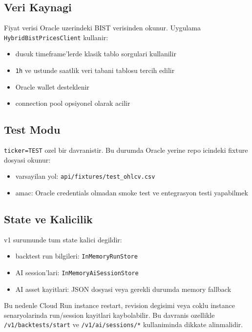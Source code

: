 \documentclass[11pt,a4paper]{article}
\begin{document}
\subsection{Veri Kaynagi}

Fiyat verisi Oracle uzerindeki BIST verisinden okunur. Uygulama \texttt{HybridBistPricesClient} kullanir:

\begin{itemize}[leftmargin=1.5em]
    \item dusuk timeframe'lerde klasik tablo sorgulari kullanilir
    \item \texttt{1h} ve ustunde saatlik veri tabani tablosu tercih edilir
    \item Oracle wallet desteklenir
    \item connection pool opsiyonel olarak acilir
\end{itemize}

\subsection{Test Modu}

\texttt{ticker=TEST} ozel bir davranistir. Bu durumda Oracle yerine repo icindeki fixture dosyasi okunur:

\begin{itemize}[leftmargin=1.5em]
    \item varsayilan yol: \texttt{api/fixtures/test\_ohlcv.csv}
    \item amac: Oracle credentials olmadan smoke test ve entegrasyon testi yapabilmek
\end{itemize}

\subsection{State ve Kalicilik}

v1 surumunde tum state kalici degildir:

\begin{itemize}[leftmargin=1.5em]
    \item backtest run bilgileri: \texttt{InMemoryRunStore}
    \item AI session'lari: \texttt{InMemoryAiSessionStore}
    \item AI asset kayitlari: JSON dosyasi veya gerekli durumda memory fallback
\end{itemize}

Bu nedenle Cloud Run instance restart, revision degisimi veya coklu instance senaryolarinda run/session kayitlari kaybolabilir. Bu davranis ozellikle \texttt{/v1/backtests/start} ve \texttt{/v1/ai/sessions/*} kullaniminda dikkate alinmalidir.
\end{document}
